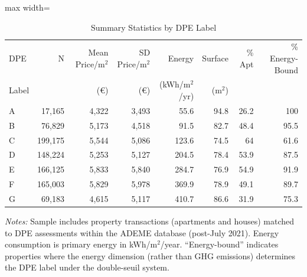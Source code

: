 \begin{table}[htbp]
\centering
\caption{Summary Statistics by DPE Label}
\label{tab:summary}
\begin{adjustbox}{max width=\textwidth}
\begin{tabular}{l r r r r r r r}
\hline\hline
DPE & N & Mean Price/m$^2$ & SD Price/m$^2$ & Energy & Surface & \% Apt & \% Energy-Bound \\
Label & & (\euro) & (\euro) & (kWh/m$^2$/yr) & (m$^2$) & & \\
\hline
A &  17,165 & 4,322 & 3,493 & 55.6 & 94.8 & 26.2 & 100 \\
B &  76,829 & 5,173 & 4,518 & 91.5 & 82.7 & 48.4 & 95.5 \\
C & 199,175 & 5,544 & 5,086 & 123.6 & 74.5 & 64 & 61.6 \\
D & 148,224 & 5,253 & 5,127 & 204.5 & 78.4 & 53.9 & 87.5 \\
E & 166,125 & 5,833 & 5,840 & 284.7 & 76.9 & 54.9 & 91.9 \\
F & 165,003 & 5,829 & 5,978 & 369.9 & 78.9 & 49.1 & 89.7 \\
G &  69,183 & 4,615 & 5,117 & 410.7 & 86.6 & 31.9 & 75.3 \\
\hline\hline
\end{tabular}
\end{adjustbox}
\begin{minipage}{\textwidth}
\small\textit{Notes:} Sample includes property transactions (apartments and houses) matched to DPE assessments within the ADEME database (post-July 2021). Energy consumption is primary energy in kWh/m$^2$/year. ``Energy-bound'' indicates properties where the energy dimension (rather than GHG emissions) determines the DPE label under the double-seuil system.
\end{minipage}
\end{table}

